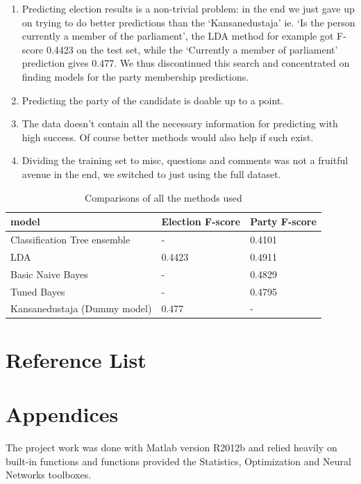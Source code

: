 \documentclass[a4paper,10pt]{article}
\begin{document}
\begin{enumerate}
\item  Predicting election results is a non-trivial problem: in the end we just gave up on trying to do better predictions than the ‘Kansanedustaja’ ie. ‘Is the person currently a member of the parliament’, the LDA method for example got F-score 0.4423 on the test set, while the ‘Currently a member of parliament’ prediction gives 0.477. We thus discontinued this search and concentrated on finding models for the party membership predictions.


\item  Predicting the party of the candidate is doable up to a point.


\item  The data doesn’t contain all the necessary information for predicting with high success. Of course better methods would also help if such exist.

\item Dividing the training set to misc, questions and comments was not a fruitful avenue in the end, we switched to just using the full dataset.
\end{enumerate}

\begin{table}
	\caption{Comparisons of all the methods used}
    \begin{tabular}{|l|l|l|}
    \hline
    model                        & Election F-score & Party F-score \\ \hline
    Classification Tree ensemble & -                & 0.4101        \\ \hline
    LDA                          & 0.4423           & 0.4911        \\ \hline
    Basic Naive Bayes            & -                & 0.4829        \\ \hline
    Tuned Bayes                  & -                & 0.4795        \\ \hline
    Kansanedustaja (Dummy model) & 0.477            & -             \\ \hline
    \end{tabular}
\end{table}

\section{Reference List}



\section{Appendices}

The project work was done with Matlab version R2012b and relied heavily on built-in functions and functions provided the Statistics, Optimization and Neural Networks toolboxes.
\end{document}
